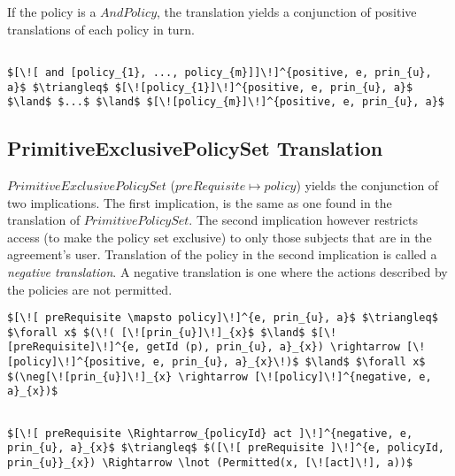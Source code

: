 If the policy is a $AndPolicy$, the translation yields a conjunction of positive translations of each policy in turn.

\lstset{mathescape, language=AST}  
\begin{lstlisting}[frame=single, caption={Positive Policy Translation {$\colon$} List of policies},label={lst:transpolicypositiveListOfPolicies}]

$[\![ and [policy_{1}, ..., policy_{m}]]\!]^{positive, e, prin_{u}, a}$ $\triangleq$ $[\![policy_{1}]\!]^{positive, e, prin_{u}, a}$ $\land$ $...$ $\land$ $[\![policy_{m}]\!]^{positive, e, prin_{u}, a}$

\end{lstlisting}


\subsection{PrimitiveExclusivePolicySet Translation}
$PrimitiveExclusivePolicySet$ ($preRequisite \mapsto policy$) yields the conjunction of two implications. The first implication, is the same as one found in the translation of $PrimitivePolicySet$. The second implication however restricts access (to make the policy set exclusive) to only those subjects that are in the agreement's user. Translation of the policy in the second implication is called a \emph{negative translation}. A negative translation is one where the actions described by the policies are not permitted. 


\lstset{mathescape, language=AST}  
\begin{lstlisting}[frame=single, caption={Policy Set Translation {$\colon$} PrimitiveExclusivePolicySet},label={lst:transpolicyformulaPrimitiveExclusivePolicySet}]
$[\![ preRequisite \mapsto policy]\!]^{e, prin_{u}, a}$ $\triangleq$ $\forall x$ $(\!( [\![prin_{u}]\!]_{x}$ $\land$ $[\![preRequisite]\!]^{e, getId (p), prin_{u}, a}_{x}) \rightarrow [\![policy]\!]^{positive, e, prin_{u}, a}_{x}\!)$ $\land$ $\forall x$ $(\neg[\![prin_{u}]\!]_{x} \rightarrow [\![policy]\!]^{negative, e, a}_{x})$
\end{lstlisting}


\lstset{mathescape, language=AST}  
\begin{lstlisting}[frame=single, caption={Negative Policy Translation {$\colon$} Single policy},label={lst:transpolicynegativeSingle}]

$[\![ preRequisite \Rightarrow_{policyId} act ]\!]^{negative, e, prin_{u}, a}_{x}$ $\triangleq$ $([\![ preRequisite ]\!]^{e, policyId, prin_{u}}_{x}) \Rightarrow \lnot (Permitted(x, [\![act]\!], a))$
\end{lstlisting}

